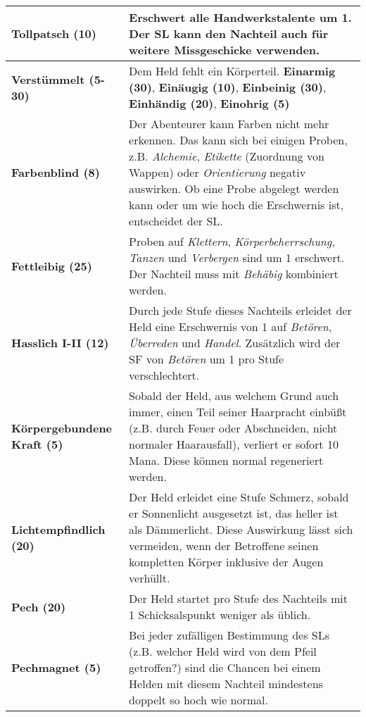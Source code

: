 \begin{longtable}{|p{5cm}|p{11cm}|}
\textbf{Tollpatsch (10)} & Erschwert alle Handwerkstalente um 1. Der SL kann den Nachteil auch für weitere Missgeschicke verwenden. \\ \hline

\textbf{Verstümmelt (5-30)} & Dem Held fehlt ein Körperteil. \textbf{Einarmig (30)}, \textbf{Einäugig (10)}, \textbf{Einbeinig (30)}, \textbf{Einhändig (20)}, \textbf{Einohrig (5)} \\ \hline

\textbf{Farbenblind (8)} & Der Abenteurer kann Farben nicht mehr erkennen. Das kann sich bei einigen Proben, z.B. \textit{Alchemie}, \textit{Etikette} (Zuordnung von Wappen) oder \textit{Orientierung} negativ auswirken. Ob eine Probe abgelegt werden kann oder um wie hoch die Erschwernis ist, entscheidet der SL. \\ \hline

\textbf{Fettleibig (25)} & Proben auf \textit{Klettern}, \textit{Körperbeherrschung}, \textit{Tanzen} und \textit{Verbergen} sind um 1 erschwert. Der Nachteil muss mit \textit{Behäbig} kombiniert werden. \\ \hline

\textbf{Hasslich I-II (12)} & Durch jede Stufe dieses Nachteils erleidet der Held eine Erschwernis von 1 auf \textit{Betören}, \textit{Überreden} und \textit{Handel}. Zusätzlich wird der SF von \textit{Betören} um 1 pro Stufe verschlechtert. \\ \hline

\textbf{Körpergebundene Kraft (5)} & Sobald der Held, aus welchem Grund auch immer, einen Teil seiner Haarpracht einbüßt (z.B. durch Feuer oder Abschneiden, nicht normaler Haarausfall), verliert er sofort 10 Mana. Diese können normal regeneriert werden. \\ \hline

\textbf{Lichtempfindlich (20)} & Der Held erleidet eine Stufe Schmerz, sobald er Sonnenlicht ausgesetzt ist, das heller ist als Dämmerlicht. Diese Auswirkung lässt sich vermeiden, wenn der Betroffene seinen kompletten Körper inklusive der Augen verhüllt. \\ \hline

\textbf{Pech (20)} & Der Held startet pro Stufe des Nachteils mit 1 Schicksalspunkt weniger als üblich. \\ \hline

\textbf{Pechmagnet (5)} & Bei jeder zufälligen Bestimmung des SLs (z.B. welcher Held wird von dem Pfeil getroffen?) sind die Chancen bei einem Helden mit diesem Nachteil mindestens doppelt so hoch wie normal. \\ \hline


\end{longtable}

